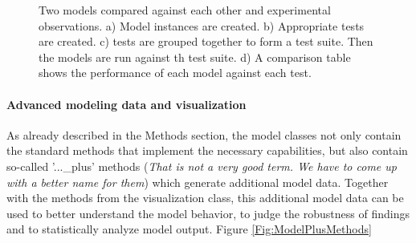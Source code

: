 \documentclass[a4paper,10pt]{article}
\begin{document}
\begin{figure}
\label{Fig:ModelComparisons}
\caption{Two models compared against each other and experimental observations. a) Model instances are created. b) Appropriate tests are created. c) tests are grouped together to form a test suite. Then the models
are run against th test suite. d) A comparison table shows the performance of each model against each test.}
\end{figure}

\paragraph{Advanced modeling data and visualization}
As already described in the Methods section, the model classes not only contain the standard methods that implement the necessary capabilities, but also contain so-called '...\_plus' methods (\textit{That is not a very good term. 
We have to come up with a better name for them}) which generate additional model data. Together with the methods from the visualization class, this additional model data can be used to better understand the model behavior, 
to judge the robustness of findings and to statistically analyze model output. Figure \ref{Fig:ModelPlusMethods}
\end{document}
